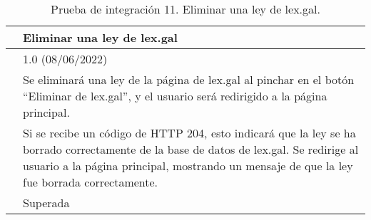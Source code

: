 \begin{table}[H]
\begin{center}
\begin{tabular}{|p{3cm}|p{10cm}|} \hline
\centering {\bf PI-11} & Eliminar una ley de lex.gal  \\ \hline\hline
\centering {\bf Versión} & 1.0 (08/06/2022) \\ \hline
\centering {\bf Descripción} & Se eliminará una ley de la página de lex.gal al pinchar en el botón ``Eliminar de lex.gal'', y el usuario será redirigido a la página principal. \\ \hline
\centering {\bf Criterio de aceptación} & Si se recibe un código de HTTP 204, esto indicará que la ley se ha borrado correctamente de la base de datos de lex.gal. Se redirige al usuario a la página principal, mostrando un mensaje de que la ley fue borrada correctamente. \\ \hline
\centering {\bf Estado} & Superada \\ \hline
\end{tabular}
\caption{Prueba de integración 11. Eliminar una ley de lex.gal.}
\label{enlacePI11}
\end{center}
\end{table}